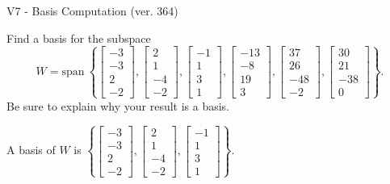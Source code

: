 \begin{exercise}
  \begin{exerciseTitle}V7 - Basis Computation (ver. 364)\end{exerciseTitle}
  \begin{exerciseStatement}
    Find a basis for the subspace 
\[W=\mathrm{span}\ \left\{\left[\begin{array}{r}
-3 \\
-3 \\
2 \\
-2
\end{array}\right] , \left[\begin{array}{r}
2 \\
1 \\
-4 \\
-2
\end{array}\right] , \left[\begin{array}{r}
-1 \\
1 \\
3 \\
1
\end{array}\right] , \left[\begin{array}{r}
-13 \\
-8 \\
19 \\
3
\end{array}\right] , \left[\begin{array}{r}
37 \\
26 \\
-48 \\
-2
\end{array}\right] , \left[\begin{array}{r}
30 \\
21 \\
-38 \\
0
\end{array}\right]\right\}.\]
 Be sure to explain why your result is a basis.


  \end{exerciseStatement}
  \begin{exerciseAnswer}
   A basis of \(W\) is  \(\left\{\left[\begin{array}{r}
-3 \\
-3 \\
2 \\
-2
\end{array}\right] , \left[\begin{array}{r}
2 \\
1 \\
-4 \\
-2
\end{array}\right] , \left[\begin{array}{r}
-1 \\
1 \\
3 \\
1
\end{array}\right]\right\}\).
  


  \end{exerciseAnswer}
\end{exercise}